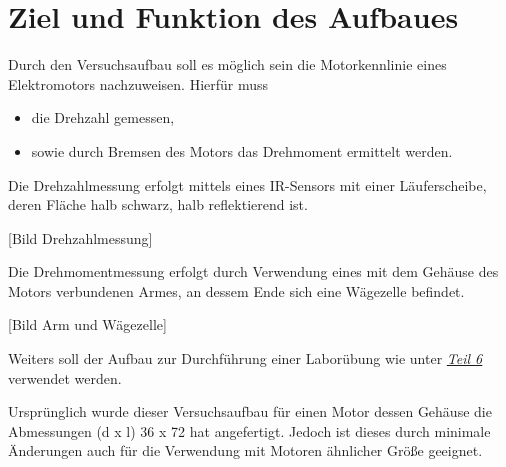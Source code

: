\chapter{Ziel und Funktion des Aufbaues}

Durch den Versuchsaufbau soll es möglich sein die Motorkennlinie eines Elektromotors nachzuweisen.
Hierfür muss

\begin{itemize}
    \item die Drehzahl gemessen,
    \item sowie durch Bremsen des Motors das Drehmoment ermittelt werden.
\end{itemize}

Die Drehzahlmessung erfolgt mittels eines IR-Sensors mit einer Läuferscheibe, deren Fläche halb schwarz, halb reflektierend ist.

[Bild Drehzahlmessung]

Die Drehmomentmessung erfolgt durch Verwendung eines mit dem Gehäuse des Motors verbundenen Armes, an dessem Ende sich eine Wägezelle befindet.

[Bild Arm und Wägezelle]

Weiters soll der Aufbau zur Durchführung einer Laborübung wie unter \hyperref[labuebung]{\textit{Teil 6}} verwendet werden.

Ursprünglich wurde dieser Versuchsaufbau für einen Motor dessen Gehäuse die Abmessungen (d x l) 36 x 72 hat angefertigt.
Jedoch ist dieses durch minimale Änderungen auch für die Verwendung mit Motoren ähnlicher Größe geeignet.
